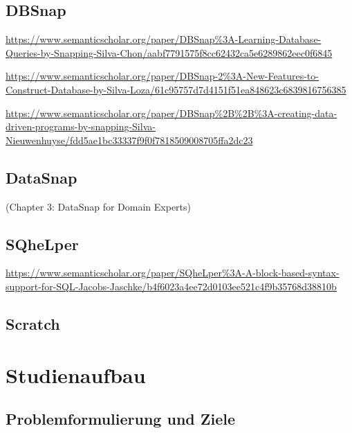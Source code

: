 \documentclass[oneside,a4paper,11pt,openright]{scrreprt}
\begin{document}
\clearpage



% 



\clearpage


\subsection{DBSnap}
\parencite{silvaDBSnapLearning2015}
\url{https://www.semanticscholar.org/paper/DBSnap\%3A-Learning-Database-Queries-by-Snapping-Silva-Chon/aabf7791575f8cc62432ca5e6289862eec0f6845}

\url{https://www.semanticscholar.org/paper/DBSnap-2\%3A-New-Features-to-Construct-Database-by-Silva-Loza/61c95757d7d4151f51ea848623c6839816756385}

\url{https://www.semanticscholar.org/paper/DBSnap\%2B\%2B\%3A-creating-data-driven-programs-by-snapping-Silva-Nieuwenhuyse/fdd5ae1bc33337f9f0f7818509008705ffa2dc23}

\subsection{DataSnap}
\parencite{hellmannDataSnapEnabling2015} (Chapter 3: DataSnap for Domain Experts)

\subsection{SQheLper}
\parencite{jacobsSQheLperBlockbased2021}
\url{https://www.semanticscholar.org/paper/SQheLper\%3A-A-block-based-syntax-support-for-SQL-Jacobs-Jaschke/b4f6023a4ee72d0103ee521c4f9b35768d38810b}
\subsection{Scratch}








\clearpage
\section{Studienaufbau}
\subsection{Problemformulierung und Ziele}
\end{document}
